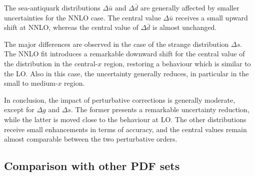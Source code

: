The sea-antiquark distributions $\Delta \bar{u}$ and $\Delta \bar{d}$ are generally affected by smaller uncertainties for the NNLO case. The central value $\Delta \bar{u}$ receives a small upward shift at NNLO, whereas the central value of $\Delta \bar{d}$ is almost unchanged.%

The major differences are observed in the case of the strange distribution $\Delta s$. The NNLO fit introduces a remarkable downward shift for the central value of the distribution in the central-$x$ region, restoring a behaviour which is similar to the LO. Also in this case, the uncertainty generally reduces, in particular in the small to medium-$x$ region.%

In conclusion, the impact of perturbative corrections is generally moderate, except for $\Delta g$ and $\Delta s$. The former presents a remarkable uncertainty reduction, while the latter is moved close to the behaviour at LO. The other distributions receive small enhancements in terms of accuracy, and the central values remain almost comparable between the two perturbative orders.

\subsection*{Comparison with other PDF sets}

